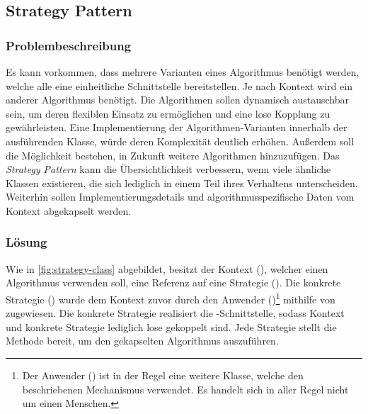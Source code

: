 \subsection{Strategy Pattern}

\subsubsection*{Problembeschreibung}

Es kann vorkommen, dass mehrere Varianten eines Algorithmus benötigt werden, welche alle eine einheitliche Schnittstelle bereitstellen. Je nach Kontext wird ein anderer Algorithmus benötigt. Die Algorithmen sollen dynamisch austauschbar sein, um deren flexiblen Einsatz zu ermöglichen und eine lose Kopplung zu gewährleisten. Eine Implementierung der Algorithmen-Varianten innerhalb der ausführenden Klasse, würde deren Komplexität deutlich erhöhen. Außerdem soll die Möglichkeit bestehen, in Zukunft weitere Algorithmen hinzuzufügen. Das \emph{Strategy Pattern} kann die Übersichtlichkeit verbessern, wenn viele ähnliche Klassen existieren, die sich lediglich in einem Teil ihres Verhaltens unterscheiden. Weiterhin sollen Implementierungsdetails und algorithmusspezifische Daten vom Kontext abgekapselt werden. \cite{gamma_design_1995}

\subsubsection*{Lösung}

Wie in \autoref{fig:strategy-class} abgebildet, besitzt der Kontext (), welcher einen Algorithmus verwenden soll, eine Referenz auf eine Strategie (). Die konkrete Strategie () wurde dem Kontext zuvor durch den Anwender ()\footnote{Der Anwender () ist in der Regel eine weitere Klasse, welche den beschriebenen Mechanismus verwendet. Es handelt sich in aller Regel nicht um einen Menschen.\label{ftn:client}} mithilfe von  zugewiesen. Die konkrete Strategie realisiert die -Schnittstelle, sodass Kontext und konkrete Strategie lediglich lose gekoppelt sind. Jede Strategie stellt die Methode  bereit, um den gekapselten Algorithmus auszuführen.


